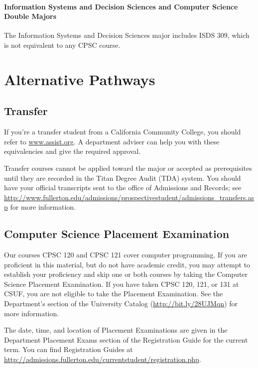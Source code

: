 \documentclass{book}
\newcommand{\CampusName}{CSUF}
\begin{document}
\subsubsection{Information Systems and Decision Sciences and Computer Science Double Majors}

The Information Systems and Decision Sciences major includes ISDS 309, which is not equivalent to any CPSC course.
 
\chapter{Alternative Pathways}

\section{Transfer}

If you're a transfer student from a California Community College, you should refer to \url{www.assist.org}. A department adviser can help you with these equivalencies and give the required approval.

Transfer courses cannot be applied toward the major or accepted as prerequisites until they are recorded in the Titan Degree Audit (TDA) system. You should have your official transcripts sent to the office of Admissions and Records; see \url{http://www.fullerton.edu/admissions/prospectivestudent/admissions_transfers.asp} for more information.

\section{Computer Science Placement Examination}
\label{section:placement}
Our courses CPSC 120 and CPSC 121 cover computer programming. If you are
proficient in this material, but do not have academic credit, you may attempt
to establish your proficiency and skip one or both courses by taking the
Computer Science Placement Examination. If you have taken CPSC 120, 121, or 131
at \CampusName, you are not eligible to take the Placement Examination. See the Department's
section of the University Catalog (\url{http://bit.ly/28UJMqn}) for more information.

The date, time, and location of Placement Examinations are given in the Department Placement Exams section of the Registration Guide for the current term. You can find Registration Guides at \url{http://admissions.fullerton.edu/currentstudent/registration.php}.
\end{document}
